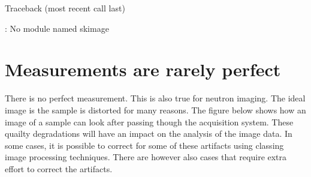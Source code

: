 \documentclass[letterpaper,10pt,english]{sphinxmanual}
\begin{document}
\begin{sphinxVerbatim}[commandchars=\\\{\}]
Traceback (most recent call last)
  
    
    
    
    
    

: No module named \PYGZsq{}skimage\PYGZsq{}
\end{sphinxVerbatim}


\chapter{Measurements are rarely perfect}
\label{\detokenize{02-ImageEnhancement:measurements-are-rarely-perfect}}


\sphinxAtStartPar
There is no perfect measurement. This is also true for neutron imaging. The ideal image is the sample is distorted for many reasons. The figure below shows how an image of a sample can look after passing though the acquisition system. These quailty degradations will have an impact on the analysis of the image data. In some cases, it is possible to correct for some of these artifacts using classing image processing techniques. There are however also cases that require extra effort to correct the artifacts.
\end{document}
